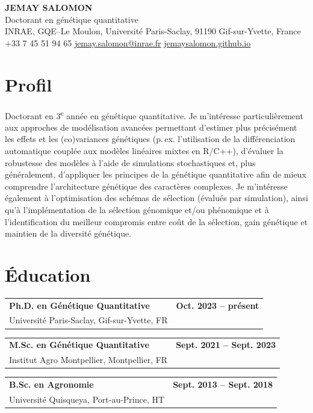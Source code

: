 \documentclass[10pt,a4paper]{article}
\makeatletter
\newcommand{\sizeTitre}{\fontsize{11}{13.2}\selectfont}  %
\newcommand{\sizeDate} {\fontsize{10}{13.2}\selectfont}  %
\newcommand{\sizeOrg}  {\fontsize{10}{12}\selectfont}    %
\newcommand{\sizeLieu} {\fontsize{10}{12}\selectfont}    %
\newcommand{\cventry}[5][2pt]{%
  \par\noindent\begin{tabularx}{\textwidth}{@{}Xr@{}}
    {\sizeTitre\textbf{#2}} & {\sizeDate\textbf{#5}}\\
    {\sizeOrg #3}   & {\sizeLieu #4}\\
  \end{tabularx}\par\vspace{#1}}
\makeatother
\begin{document}
\pagestyle{empty}

\begin{center}
{\Huge\bfseries\color{accent} JEMAY SALOMON}\\[2pt]
{\large Doctorant en génétique quantitative}\\[4pt]
INRAE, GQE--Le Moulon, Université Paris-Saclay, 91190 Gif-sur-Yvette, France\\[2pt]
+33 7 45 51 94 65 \quad\textbar\quad
\href{mailto:jemay.salomon@inrae.fr}{jemay.salomon@inrae.fr} \quad\textbar\quad
\href{https://jemaysalomon.github.io/}{jemaysalomon.github.io}
\end{center}

\section{Profil}
Doctorant en 3\textsuperscript{e} année en génétique quantitative. Je m'intéresse particulièrement aux approches de modélisation avancées permettant d'estimer plus précisément les effets et les (co)variances génétiques (p.\,ex. l'utilisation de la différenciation automatique couplée aux modèles linéaires mixtes en R/C++), d'évaluer la robustesse des modèles à l'aide de simulations stochastiques et, plus généralement, d'appliquer les principes de la génétique quantitative afin de mieux comprendre l'architecture génétique des caractères complexes. Je m'intéresse également à l'optimisation des schémas de sélection (évalués par simulation), ainsi qu'à l'implémentation de la sélection génomique et/ou phénomique et à l'identification du meilleur compromis entre coût de la sélection, gain génétique et maintien de la diversité génétique.

\section{Éducation}
\cventry[8pt]{Ph.D. en Génétique Quantitative}{Université Paris-Saclay, Gif-sur-Yvette, FR}{}{Oct. 2023 -- présent}
\cventry[8pt]{M.Sc. en Génétique Quantitative}{Institut Agro Montpellier, Montpellier, FR}{}{Sept. 2021 -- Sept. 2023}
\cventry{B.Sc. en Agronomie}{Université Quisqueya, Port-au-Prince, HT}{}{Sept. 2013 -- Sept. 2018}
\end{document}

